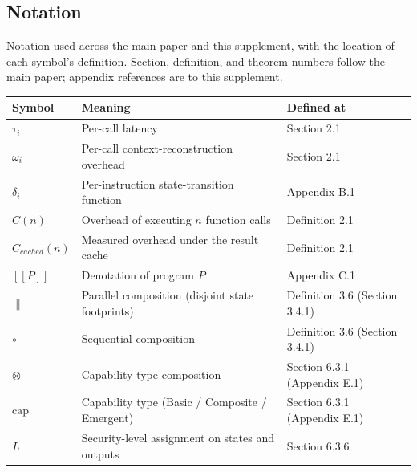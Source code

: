 \documentclass[
  11pt,
]{article}
\newcounter{none} %
\newcommand{\llbracket}{[\![}
\newcommand{\rrbracket}{]\!]}
\begin{document}
\subsection{Notation}\label{notation}

Notation used across the main paper and this supplement, with the
location of each symbol's definition. Section, definition, and theorem
numbers follow the main paper; appendix references are to this
supplement.

{\def\LTcaptype{none} %
\begin{longtable}[]{@{}
  >{\raggedright\arraybackslash}p{}
  >{\raggedright\arraybackslash}p{}
  >{\raggedright\arraybackslash}p{}@{}}
\toprule\noalign{}
\begin{minipage}[b]{\linewidth}\raggedright
Symbol
\end{minipage} & \begin{minipage}[b]{\linewidth}\raggedright
Meaning
\end{minipage} & \begin{minipage}[b]{\linewidth}\raggedright
Defined at
\end{minipage} \\
\midrule\noalign{}
\endhead
\bottomrule\noalign{}
\endlastfoot
\(\tau_i\) & Per-call latency & Section 2.1 \\
\(\omega_i\) & Per-call context-reconstruction overhead & Section 2.1 \\
\(\delta_i\) & Per-instruction state-transition function & Appendix
B.1 \\
\(C(n)\) & Overhead of executing \(n\) function calls & Definition
2.1 \\
\(C_{cached}(n)\) & Measured overhead under the result cache &
Definition 2.1 \\
\(\llbracket P \rrbracket\) & Denotation of program \(P\) & Appendix
C.1 \\
\(\parallel\) & Parallel composition (disjoint state footprints) &
Definition 3.6 (Section 3.4.1) \\
\(\circ\) & Sequential composition & Definition 3.6 (Section 3.4.1) \\
\(\otimes\) & Capability-type composition & Section 6.3.1 (Appendix
E.1) \\
\(\text{cap}\) & Capability type (Basic / Composite / Emergent) &
Section 6.3.1 (Appendix E.1) \\
\(L\) & Security-level assignment on states and outputs & Section 6.3.6

\end{longtable}}
\end{document}
